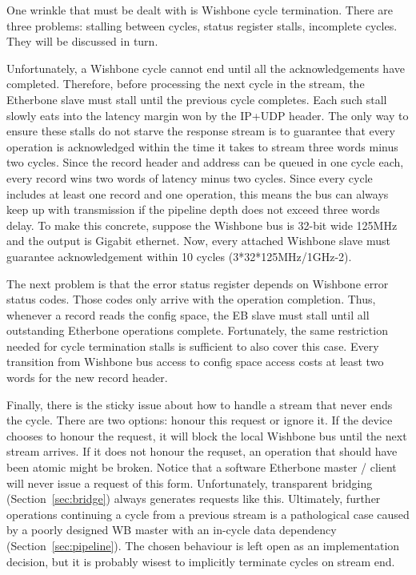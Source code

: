\documentclass{article}
\begin{document}
One wrinkle that must be dealt with is Wishbone cycle termination.
There are three problems: 
stalling between cycles, 
status register stalls,
incomplete cycles.
They will be discussed in turn.

Unfortunately, a Wishbone cycle cannot end until all the acknowledgements
have completed.
Therefore,
before processing the next cycle in the stream,
the Etherbone slave must stall until the previous cycle completes.
Each such stall slowly eats into the latency margin 
won by the IP+UDP header.
The only way to ensure these stalls do not starve the response stream
is to guarantee that every operation is acknowledged within the time
it takes to stream three words minus two cycles.
Since the record header and address can be queued in one cycle each,
every record wins two words of latency minus two cycles.
Since every cycle includes at least one record and one operation,
this means the bus can always keep up with transmission if
the pipeline depth does not exceed three words delay.
To make this concrete,
suppose the Wishbone bus is 32-bit wide 125MHz and 
the output is Gigabit ethernet.
Now, every attached Wishbone slave must 
guarantee acknowledgement within 10 cycles
(3*32*125MHz/1GHz-2).

The next problem is that the error status register depends on Wishbone
error status codes.
Those codes only arrive with the operation completion.
Thus, whenever a record reads the config space,
the EB slave must stall until all outstanding Etherbone operations complete.
Fortunately, the same restriction needed for cycle termination stalls
is sufficient to also cover this case.
Every transition from Wishbone bus access to config space access costs
at least two words for the new record header.

Finally, there is the sticky issue about how to handle 
a stream that never ends the cycle.
There are two options:
honour this request or ignore it.
If the device chooses to honour the request,
it will block the local Wishbone bus until the next stream arrives.
If it does not honour the requset,
an operation that should have been atomic might be broken.
Notice that
a software Etherbone master / client will never issue a request of this form.
Unfortunately, 
transparent bridging (Section~\ref{sec:bridge}) always generates requests like this.
Ultimately, 
further operations continuing a cycle from a previous stream
is a pathological case caused by a poorly designed WB master
with an in-cycle data dependency (Section~\ref{sec:pipeline}).
The chosen behaviour is left open as an implementation decision,
but it is probably wisest to implicitly terminate cycles on stream end.
\end{document}
